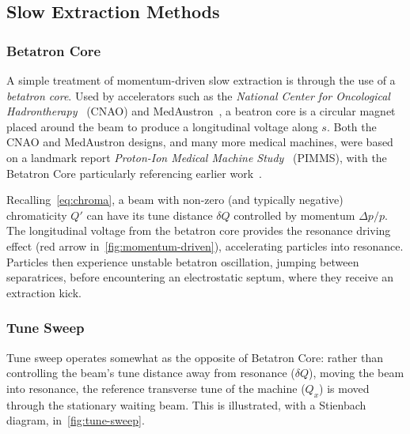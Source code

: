 \documentclass[11pt]{report}
\begin{document}
\subsection{Slow Extraction Methods}



\subsubsection{Betatron Core}

A simple treatment of momentum-driven slow extraction is through the use of a \textit{betatron core}. Used by accelerators such as the \textit{National Center for Oncological Hadrontherapy}~\cite{Falbo:IPAC2018-TUZGBF3} (CNAO) and MedAustron~\cite{pablo}, a beatron core is a circular magnet placed around the beam to produce a longitudinal voltage along $s$. Both the CNAO and MedAustron designs, and many more medical machines, were based on a landmark report \textit{Proton-Ion Medical Machine Study}~\cite{PIMMS} (PIMMS), with the Betatron Core particularly referencing earlier work~\cite{betatroncore}.

Recalling~\autoref{eq:chroma}, a beam with non-zero (and typically negative) chromaticity $Q'$ can have its tune distance $\delta Q$ controlled by momentum $\Delta p/p$. The longitudinal voltage from the betatron core provides the resonance driving effect (red arrow in~\autoref{fig:momentum-driven}), accelerating particles into resonance. Particles then experience unstable betatron oscillation, jumping between separatrices, before encountering an electrostatic septum, where they receive an extraction kick.

\subsubsection{Tune Sweep}
Tune sweep operates somewhat as the opposite of Betatron Core: rather than controlling the beam's tune distance away from resonance ($\delta Q$), moving the beam into resonance, the reference transverse tune of the machine ($Q_x$) is moved through the stationary waiting beam. This is illustrated, with a Stienbach diagram, in~\autoref{fig:tune-sweep}.
\end{document}
